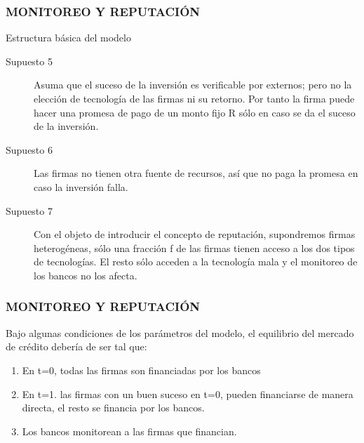 \begin{frame}
    \frametitle{{\normalsize MONITOREO Y REPUTACIÓN} {}}
    
    \begin{block} {Estructura básica del modelo}
        \begin{description}
             \item[Supuesto 5] Asuma que el suceso de la inversión es verificable por externos; pero no la elección de tecnología de las firmas ni su retorno. Por tanto la firma puede hacer una promesa de pago de un monto fijo R sólo en caso se da el suceso de la inversión.
            \item[Supuesto 6] Las firmas no tienen otra fuente de recursos, así que no paga la promesa en caso la inversión falla.
           \item[Supuesto 7] Con el objeto de introducir el concepto de reputación, supondremos firmas heterogéneas, sólo una fracción f de las firmas tienen acceso a los dos tipos de tecnologías. El resto sólo acceden a la tecnología mala y el monitoreo de los bancos no los afecta. 
        \end{description}
          
    \end{block}	

   
\end{frame}



\begin{frame}
\frametitle{{\normalsize MONITOREO Y REPUTACIÓN} {}}	

Bajo algunas condiciones de los parámetros del modelo, el equilibrio del mercado de crédito debería de ser tal que:
\begin{enumerate}
	\item En t=0, todas las firmas son financiadas por los bancos
	\item En t=1. las firmas con un buen suceso en t=0, pueden financiarse de manera directa, el resto se financia por los bancos.
	\item Los bancos monitorean a las firmas que financian.
\end{enumerate} 
\end{frame}


